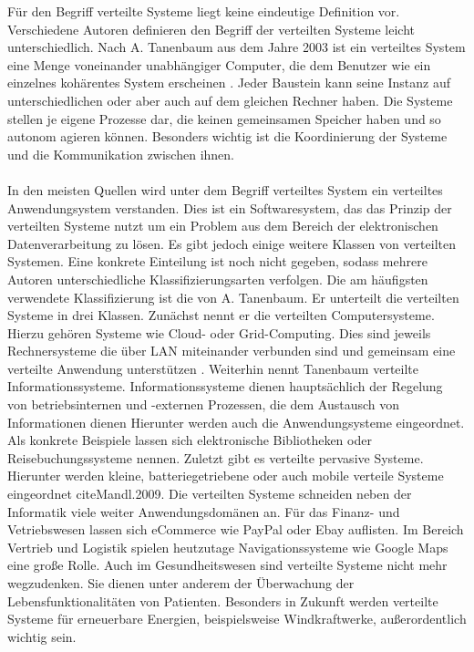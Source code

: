 \documentclass[utf8,biblatex]{lni}
\begin{document}
Für den Begriff \glqq verteilte Systeme\grqq{} liegt keine eindeutige Definition vor. Verschiedene Autoren definieren den Begriff der verteilten Systeme leicht unterschiedlich.
Nach A. Tanenbaum aus dem Jahre 2003 ist ein verteiltes System eine Menge voneinander unabhängiger Computer, die dem Benutzer wie ein einzelnes kohärentes System
erscheinen \cite{Mandl.2009}. Jeder Baustein kann seine Instanz auf unterschiedlichen oder aber auch auf dem gleichen Rechner haben. Die Systeme stellen je eigene Prozesse dar,
 die keinen gemeinsamen
Speicher haben und so autonom agieren können. Besonders wichtig ist die Koordinierung der Systeme und die Kommunikation zwischen ihnen.
\\\\
In den meisten Quellen wird unter dem Begriff verteiltes System ein verteiltes Anwendungsystem verstanden. Dies ist ein Softwaresystem, das das Prinzip der verteilten Systeme 
nutzt um ein 
Problem aus dem Bereich der elektronischen Datenverarbeitung zu lösen. Es gibt jedoch einige weitere Klassen von verteilten Systemen. Eine konkrete Einteilung ist noch nicht gegeben, sodass
mehrere Autoren unterschiedliche Klassifizierungsarten verfolgen. Die am häufigsten verwendete Klassifizierung ist die von A. Tanenbaum. Er unterteilt die verteilten Systeme
in drei Klassen. Zunächst nennt er die verteilten Computersysteme. Hierzu gehören Systeme wie Cloud- oder Grid-Computing. Dies sind jeweils Rechnersysteme die über LAN miteinander verbunden
sind und gemeinsam eine verteilte Anwendung unterstützen \cite{Mandl.2009}. Weiterhin nennt Tanenbaum verteilte Informationssysteme.
Informationssysteme dienen hauptsächlich der Regelung von betriebsinternen und -externen Prozessen, die dem Austausch von Informationen dienen \cite{Lackes.o.J.}
Hierunter werden auch die Anwendungsysteme eingeordnet. Als konkrete Beispiele lassen sich elektronische Bibliotheken oder Reisebuchungssysteme nennen.
Zuletzt gibt es verteilte pervasive Systeme. Hierunter werden kleine, batteriegetriebene oder auch mobile verteile Systeme eingeordnet cite{Mandl.2009}.
\newline
Die verteilten Systeme schneiden neben der Informatik viele weiter Anwendungsdomänen an. Für das Finanz- und Vetriebswesen lassen sich eCommerce wie PayPal oder Ebay auflisten. 
Im Bereich Vertrieb und Logistik spielen heutzutage Navigationssysteme wie Google Maps eine große Rolle. Auch im Gesundheitswesen sind verteilte Systeme nicht mehr wegzudenken. Sie dienen unter anderem
der Überwachung der Lebensfunktionalitäten von Patienten. Besonders in Zukunft werden verteilte Systeme für erneuerbare Energien, beispielsweise Windkraftwerke, außerordentlich wichtig sein. \cite{o.V.2011}
\end{document}
